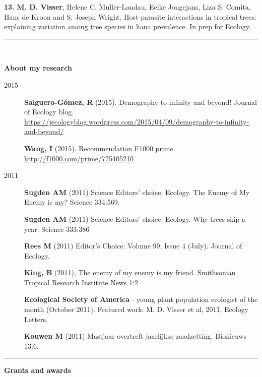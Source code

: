 \documentclass[b5paper,justified]{tufte-book} %
\begin{document}
\begin{fullwidth}
\begin{description}
\textbf{13.} \textbf{M. D. Visser}, Helene C. Muller-Landau, Eelke
Jongejans, Liza S. Comita, Hans de Kroon and S. Joseph Wright.
Host-parasite interactions in tropical trees: explaining variation among tree species in liana prevalence. In prep
for Ecology.


\end{description}

\begin{center}\rule{0.5\linewidth}{\linethickness}\end{center}

~ ~ ~

\vspace{1cm}
\Large \textbf{About my research}
\vspace{1cm}
\footnotesize

\begin{description}

\item[2015]
\textbf{Salguero-G\'omez, R} (2015). Demography to infinity and beyond!
Journal of Ecology blog.
\url{https://jecologyblog.wordpress.com/2015/04/09/demography-to-infinity-and-beyond/}

\textbf{Wang, I} (2015). Recommendation F1000 prime.
\url{http://f1000.com/prime/725405210}
\item[2011]
\textbf{Sugden AM} (2011) Science Editors' choice. Ecology. The Enemy of
My Enemy is my? Science 334:569.

\textbf{Sugden AM} (2011) Science Editors' choice. Ecology. Why trees
skip a year. Science 333:386

\textbf{Rees M} (2011) Editor's Choice: Volume 99, Issue 4 (July).
Journal of Ecology.

\textbf{King, B} (2011), The enemy of my enemy is my friend. Smithsonian
Tropical Research Institute News 1:2

\textbf{Ecological Society of America} - young plant population
ecologist of the month (October 2011). Featured work: M. D. Visser et
al, 2011, Ecology Letters.

\textbf{Kouwen M} (2011) Mastjaar overtreft jaarlijkse zaadzetting.
Bionieuws 13:6.
\end{description}

\begin{center}\rule{0.5\linewidth}{\linethickness}\end{center}

\vspace{1cm}
\Large \textbf{Grants and awards}
\vspace{1cm}
\footnotesize


\end{fullwidth}
\end{document}
